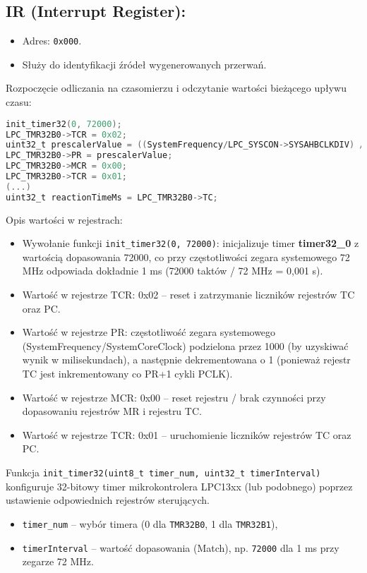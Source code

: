 \documentclass[a4paper,12pt]{report}
\begin{document}
\subsection*{IR (Interrupt Register):}
\begin{itemize}
    \item Adres: \texttt{0x000}.
    \item Służy do identyfikacji źródeł wygenerowanych przerwań.
\end{itemize}

Rozpoczęcie odliczania na czasomierzu i odczytanie wartości bieżącego upływu czasu:
\begin{lstlisting}[language=C]
init_timer32(0, 72000);
LPC_TMR32B0->TCR = 0x02;
uint32_t prescalerValue = ((SystemFrequency/LPC_SYSCON->SYSAHBCLKDIV) / 1000) - 1;
LPC_TMR32B0->PR = prescalerValue;
LPC_TMR32B0->MCR = 0x00;
LPC_TMR32B0->TCR = 0x01;
(...)
uint32_t reactionTimeMs = LPC_TMR32B0->TC;
\end{lstlisting}

Opis wartości w rejestrach:
\begin{itemize}
    \item Wywołanie funkcji \texttt{init\_timer32(0, 72000)}: inicjalizuje timer \textbf{timer32\_0} z wartością dopasowania 72000, co przy częstotliwości zegara systemowego 72 MHz odpowiada dokładnie 1 ms (72000 taktów / 72 MHz = 0{,}001 s).
    \item Wartość w rejestrze TCR: 0x02 – reset i zatrzymanie liczników rejestrów TC oraz PC.
    \item Wartość w rejestrze PR: częstotliwość zegara systemowego (SystemFrequency/SystemCoreClock) podzielona przez 1000 (by uzyskiwać wynik w milisekundach), a następnie dekrementowana o 1 (ponieważ rejestr TC jest inkrementowany co PR+1 cykli PCLK).
    \item Wartość w rejestrze MCR: 0x00 – reset rejestru / brak czynności przy dopasowaniu rejestrów MR i rejestru TC.
    \item Wartość w rejestrze TCR: 0x01 – uruchomienie liczników rejestrów TC oraz PC.
\end{itemize}

Funkcja \texttt{init\_timer32(uint8\_t timer\_num, uint32\_t timerInterval)} konfiguruje 32-bitowy timer mikrokontrolera LPC13xx (lub podobnego) poprzez ustawienie odpowiednich rejestrów sterujących.

\begin{itemize}
    \item \texttt{timer\_num} – wybór timera (0 dla \texttt{TMR32B0}, 1 dla \texttt{TMR32B1}),
    \item \texttt{timerInterval} – wartość dopasowania (Match), np. \texttt{72000} dla 1 ms przy zegarze 72 MHz.
\end{itemize}
\end{document}
